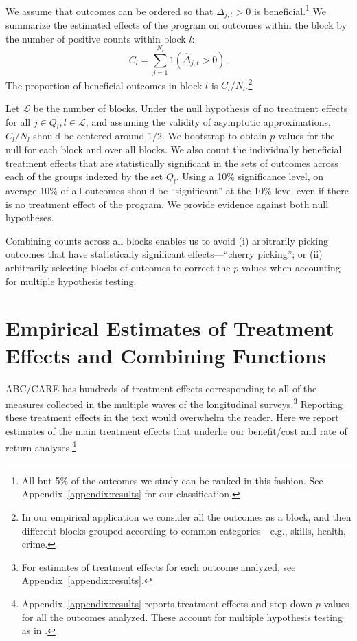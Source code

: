 We assume that outcomes can be ordered so that $\Delta_{j,t} >0$ is beneficial.\footnote{All but 5\% of the outcomes we study can be ranked in this fashion. See Appendix~\ref{appendix:results} for our classification.} We summarize the estimated effects of the program on outcomes within the block by the number of positive counts within block $l$:
\begin{equation}
C_l = \sum^{N_l}_{j=1} 1 (\hat{\Delta}_{j,t} >0).
\end{equation}
The proportion of beneficial outcomes in block $l$ is $C_l / N_l$.\footnote{In our empirical application we consider all the outcomes as a block, and then different blocks grouped according to common categories---e.g., skills, health, crime.}

Let $\mathcal{L}$ be the number of blocks. Under the null hypothesis of no treatment effects for all $j \in Q_l, l \in \mathcal{L}$, and assuming the validity of asymptotic approximations, $C_l / N_l$ should be centered around $1/2$. We bootstrap to obtain $p$-values for the null for each block and over all blocks. We also count the individually beneficial treatment effects that are statistically significant in the sets of outcomes across each of the groups indexed by the set $Q_l$. Using a 10\% significance level, on average 10\% of all outcomes should be ``significant'' at the 10\% level even if there is no treatment effect of the program. We provide evidence against both null hypotheses.

Combining counts across all blocks enables us to avoid (i) arbitrarily picking outcomes that have statistically significant effects---``cherry picking''; or (ii) arbitrarily selecting blocks of outcomes to correct the $p$-values when accounting for multiple hypothesis testing.

\section{Empirical Estimates of Treatment Effects and Combining Functions}\label{section:c-functions}

ABC/CARE has hundreds of treatment effects corresponding to all of the measures collected in the multiple waves of the longitudinal surveys.\footnote{For estimates of treatment effects for each outcome analyzed, see Appendix~\ref{appendix:results}.} Reporting these treatment effects in the text would overwhelm the reader. Here we report estimates of the main treatment effects that underlie our benefit/cost and rate of return analyses.\footnote{Appendix~\ref{appendix:results} reports treatment effects and step-down $p$-values for all the outcomes analyzed. These account for multiple hypothesis testing as in \citet{Lehman_Romano_2005_AnnStat,Romano_Shaikh_2006_AnnStat}.}

